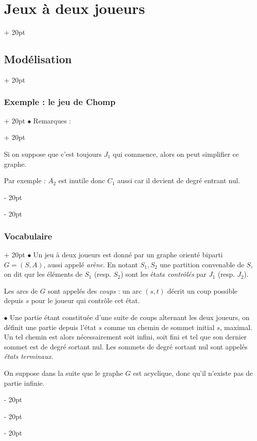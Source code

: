 \documentclass[a4paper, 12pt, twoside]{article}
\newcommand{\ind}[1][20pt]{\advance\leftskip + #1}
\newcommand{\deind}[1][20pt]{\advance\leftskip - #1}
\newenvironment{indt}[2][20pt]{#2 \par \ind[#1]}{\par \deind} %
\begin{document}
\begin{indt}{\section{Jeux à deux joueurs}}
\begin{indt}{\subsection{Modélisation}}
\begin{indt}{\subsubsection{Exemple : le jeu de Chomp}}
\begin{indt}{$\bullet$ Remarques :}
\begin{center}
                    \end{center}

                    Si on suppose que c'est toujours $J_1$ qui commence, alors on peut simplifier ce graphe.

                    Par exemple : $A_2$ est inutile donc $C_1$ aussi car il devient de degré entrant nul.
                \end{indt}
            \end{indt}

            \vspace{12pt}
            
            \begin{indt}{\subsubsection{Vocabulaire}}
                $\bullet$ Un jeu à deux joueurs est donné par un graphe orienté biparti $G = (S, A)$, aussi appelé \emph{arène}.
                En notant $S_1, S_2$ une partition convenable de $S$, on dit qur les éléments de $S_1$ (resp. $S_2$) sont les états \emph{contrôlés} par $J_1$ (resp. $J_2$).

                Les arcs de $G$ sont appelés des \emph{coups} : un arc $(s, t)$ décrit un coup possible depuis $s$ pour le joueur qui contrôle cet état.

                \vspace{12pt}
                
                $\bullet$ Une partie étant constituée d'une suite de coups alternant les deux joueurs, on définit une partie depuis l'état $s$ comme un chemin de sommet initial $s$, maximal.
                Un tel chemin est alors nécessairement soit infini, soit fini et tel que son dernier sommet est de degré sortant nul. Les sommets de degré sortant nul sont appelés \emph{états terminaux}.

                On suppose dans la suite que le graphe $G$ est acyclique, donc qu'il n'existe pas de partie infinie.


\end{indt}
\end{indt}
\end{indt}
\end{document}

